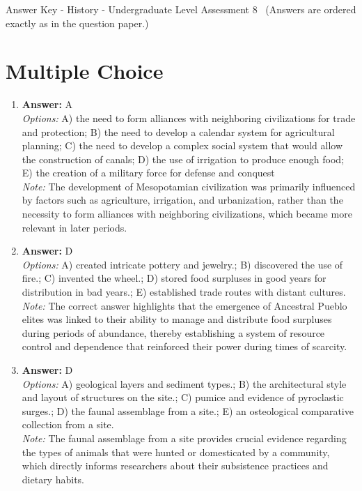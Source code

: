 \documentclass[12pt]{article}
\begin{document}
\begin{center}
Answer Key - History - Undergraduate Level Assessment 8 \
\small (Answers are ordered exactly as in the question paper.)
\end{center}

\section*{Multiple Choice}
\begin{enumerate}[label=\arabic*.]
\item \textbf{Answer:} A
\\ \textit{Options:} A) the need to form alliances with neighboring civilizations for trade and protection; B) the need to develop a calendar system for agricultural planning; C) the need to develop a complex social system that would allow the construction of canals; D) the use of irrigation to produce enough food; E) the creation of a military force for defense and conquest
\\ \textit{Note:} The development of Mesopotamian civilization was primarily influenced by factors such as agriculture, irrigation, and urbanization, rather than the necessity to form alliances with neighboring civilizations, which became more relevant in later periods.
\item \textbf{Answer:} D
\\ \textit{Options:} A) created intricate pottery and jewelry.; B) discovered the use of fire.; C) invented the wheel.; D) stored food surpluses in good years for distribution in bad years.; E) established trade routes with distant cultures.
\\ \textit{Note:} The correct answer highlights that the emergence of Ancestral Pueblo elites was linked to their ability to manage and distribute food surpluses during periods of abundance, thereby establishing a system of resource control and dependence that reinforced their power during times of scarcity.
\item \textbf{Answer:} D
\\ \textit{Options:} A) geological layers and sediment types.; B) the architectural style and layout of structures on the site.; C) pumice and evidence of pyroclastic surges.; D) the faunal assemblage from a site.; E) an osteological comparative collection from a site.
\\ \textit{Note:} The faunal assemblage from a site provides crucial evidence regarding the types of animals that were hunted or domesticated by a community, which directly informs researchers about their subsistence practices and dietary habits.

\end{enumerate}
\end{document}
